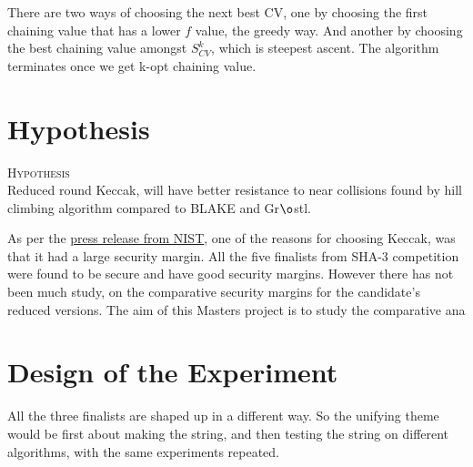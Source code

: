 There are two ways of choosing the next best CV, one by choosing the first chaining value that has a lower $f$ value, the
greedy way. And another by choosing the best chaining value amongst $S^{k}_{CV}$, which is steepest ascent. The algorithm
terminates once we get k-opt chaining value.

\section{Hypothesis}

\begin{center}
  \framebox
  {
    \parbox{375pt}
    {
      \centering \textsc{Hypothesis} \\
      Reduced round Keccak, will have better resistance to near collisions found by hill climbing algorithm
      compared to BLAKE and Gr$\o$stl.
    }
  }
\end{center}

As per the \href{"http://csrc.nist.gov/groups/ST/hash/sha-3/sha-3\_selection\_announcement.pdf"}{press release from NIST}, 
one of the reasons for choosing Keccak, was that it had a large security margin. All the five finalists from SHA-3 competition
were found to be secure and have good security margins. However there has not been much study, on the comparative security
margins for the candidate's reduced versions. The aim of this Masters project is to study the comparative ana 

\section{Design of the Experiment}
All the three finalists are shaped up in a different way. So the unifying theme would be first about making the 
string, and then testing the string on different algorithms, with the same experiments repeated.
